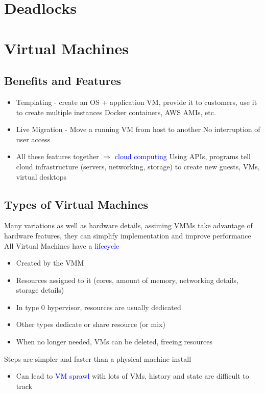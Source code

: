 \documentclass[oneside]{book}
\begin{document}
    \chapter{Deadlocks}
    \chapter{Virtual Machines}
        \section{Benefits and Features}
            \begin{itemize}
                \item Templating - create an OS + application VM, provide it to customers, use it to create multiple instances
                    \subitem Docker containers, AWS AMIs, etc.
                \item Live Migration - Move a running VM from host to another
                    \subitem No interruption of user access
                \item All these features together $\Longrightarrow$ \textcolor{blue}{cloud computing}
                    \subitem Using APIs, programs tell cloud infrastructure (servers, networking, storage) to create new guests, VMs, virtual desktops
            \end{itemize}
        \section{Types of Virtual Machines}
            Many variations as well as hardware details, assiming VMMs take advantage of hardware features, they can simplify implementation and improve performance
            All Virtual Machines have a \textcolor{blue}{lifecycle}
            \begin{itemize}
                \item Created by the VMM
                \item Resources assigned to it (cores, amount of memory, networking details, storage details)
                \item In type 0 hypervisor, resources are usually dedicated
                \item Other types dedicate or share resource (or mix)
                \item When no longer needed, VMs can be deleted, freeing resources
            \end{itemize}
            Steps are simpler and faster than a physical machine install
            \begin{itemize}
                \item Can lead to \textcolor{blue}{VM sprawl} with lots of VMs, history and state are difficult to track
            \end{itemize}
\end{document}
